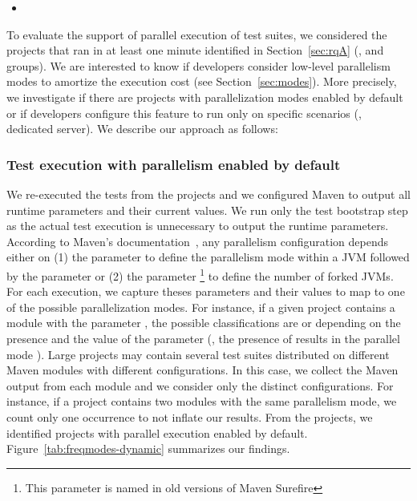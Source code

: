 \begin{itemize}
    \item \emph{\RQC}
\end{itemize}

To evaluate the support of parallel execution of test suites, we
considered the \numMedLong{} projects that ran in at least one minute
identified in Section~\ref{sec:rqA} (\ie, \medg{} and \longg{}
groups). We are interested to know if developers consider low-level
parallelism modes to amortize the execution cost (see
Section~\ref{sec:modes}). More precisely, we investigate if there are
projects with parallelization modes enabled by default or if
developers configure this feature to run only on specific scenarios
(\eg, dedicated server).  We describe our approach as follows:


\subsubsection{Test execution with parallelism enabled by default}
\label{sec:rqC-1}

We re-executed the tests from the \numMedLong{} projects and we
configured Maven to output all runtime parameters and their current
values. We run only the test bootstrap step as the actual test
execution is unnecessary to output the runtime parameters.
According to Maven's documentation~\cite{maven-surefire-plugin}, any
parallelism configuration depends either on (1) the parameter
 to define the parallelism mode within a JVM followed
by the parameter  or (2) the parameter
\footnote{This parameter is named 
in old versions of Maven Surefire} to define the number of forked
JVMs. For each execution, we capture theses parameters and their
values to map to one of the possible parallelization modes.  For
instance, if a given project contains a module with the parameter
, the possible classifications are
\ForkSeq{} or \ForkParMeth{} depending on the presence and the value
of the parameter  (\ie, the presence of
 results in the parallel mode
\ForkParMeth{}).
Large projects may contain several test suites distributed on
different Maven modules with different configurations. In this case,
we collect the Maven output from each module and we consider only the
distinct configurations. For instance, if a project contains two
modules with the same parallelism mode, we count only one occurrence
to not inflate our results.  From the \numMedLong{} projects, we
identified \numProjectsPar{} projects with parallel execution enabled
by default.  Figure~\ref{tab:freqmodes-dynamic} summarizes our
findings.

